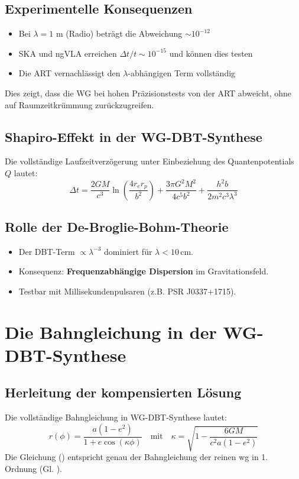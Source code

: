 \subsection{Experimentelle Konsequenzen}
\begin{itemize}
\item Bei $\lambda = 1$ m (Radio) beträgt die Abweichung $\sim 10^{-12}$
\item SKA und ngVLA erreichen $\Delta t/t \sim 10^{-15}$ und können dies testen
\item Die ART vernachlässigt den $\lambda$-abhängigen Term vollständig
\end{itemize}

Dies zeigt, dass die WG bei hohen Präzisionstests von der ART abweicht, ohne auf Raumzeitkrümmung zurückzugreifen.

\subsection{Shapiro-Effekt in der WG-DBT-Synthese}  
\label{sec:shapiro_dbt}  

Die vollständige Laufzeitverzögerung unter Einbeziehung des Quantenpotentials $Q$ lautet:  
\begin{equation}
    \label{eq:shapiro}
    \boxed
    {
        \Delta t = \frac{2GM}{c^3} \ln\left(\frac{4r_e r_p}{b^2}\right) + \frac{3\pi G^2 M^2}{4c^5 b^2} + \frac{h^2 b}{2m^2 c^3 \lambda^3}  
    }
\end{equation}
\subsection*{Rolle der De-Broglie-Bohm-Theorie}  
\begin{itemize}  
\item Der DBT-Term $\propto \lambda^{-3}$ dominiert für $\lambda < 10\,$cm.  
\item Konsequenz: \textbf{Frequenzabhängige Dispersion} im Gravitationsfeld.  
\item Testbar mit Millisekundenpulsaren (z.B. PSR J0337+1715).  
\end{itemize}  

\section{Die Bahngleichung in der WG-DBT-Synthese}
\label{sec:bahn_alpha}

\subsection{Herleitung der kompensierten Lösung}
Die vollständige Bahngleichung in WG-DBT-Synthese lautet:
\begin{equation}
    \label{eq:r_wg_dbt}
    r(\phi) = \frac{a(1-e^2)}{1 + e\cos(\kappa\phi)} \quad \text{mit} \quad \kappa = \sqrt{1 - \frac{6GM}{c^2a(1-e^2)}}
\end{equation}
Die Gleichung () entspricht genau der Bahngleichung der reinen \gls{wg} in 1. Ordnung (Gl. ).

